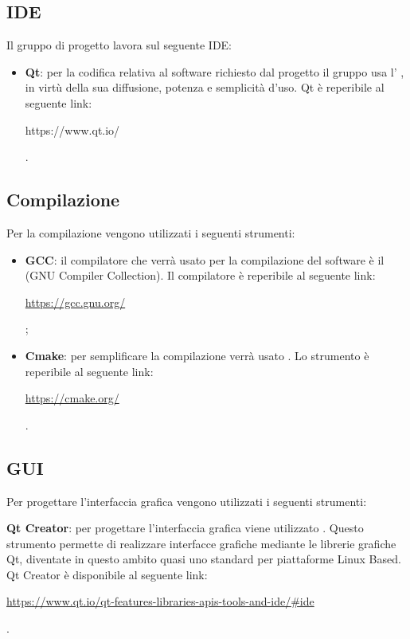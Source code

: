 \documentclass[openany,12pt,a4paper]{report}
\begin{document}
\subsection{IDE}
Il gruppo di progetto lavora sul seguente IDE:
\begin{itemize}
    \item \textbf{Qt}: per la codifica relativa al software richiesto dal progetto il gruppo usa l' , in virtù della sua diffusione, potenza e semplicità d'uso. Qt è reperibile al seguente link: \\ \centerline{https://www.qt.io/}.
\end{itemize}

\subsection{Compilazione}
Per la compilazione vengono utilizzati i seguenti strumenti:

\begin{itemize}
	\item \textbf{GCC}: il compilatore che verrà usato per la compilazione del software è il  (GNU Compiler Collection). Il compilatore è reperibile al seguente link: \\ \centerline{\url{https://gcc.gnu.org/}};
	
	\item \textbf{Cmake}: per semplificare la compilazione verrà usato . Lo strumento è reperibile al seguente link: \\ \centerline{\url{https://cmake.org/}}.
\end{itemize}

\subsection{GUI}
Per progettare l'interfaccia grafica vengono utilizzati i seguenti strumenti:

\begin{item}
    \item \textbf{Qt Creator}: per progettare l'interfaccia grafica viene utilizzato . Questo strumento permette di realizzare interfacce grafiche mediante le librerie grafiche Qt, diventate in questo ambito quasi uno standard per piattaforme Linux Based. Qt Creator è disponibile al seguente link: \\  \centerline{\url{https://www.qt.io/qt-features-libraries-apis-tools-and-ide/#ide}}.
\end{item}
\end{document}
